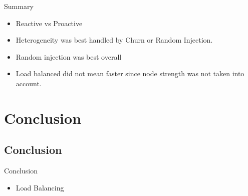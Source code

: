 \documentclass[11pt]{beamer}
\begin{document}
\begin{frame}{Summary}
	\begin{itemize}
		
		\item Reactive vs Proactive
		\item Heterogeneity was best handled by Churn or Random Injection.
		\item Random injection was best overall
		\item Load balanced did not mean faster since node strength was not taken into account.
	\end{itemize}
\end{frame}

\section{Conclusion}

\subsection{Conclusion}

\begin{frame}{Conclusion}
	\begin{itemize}
		\item Load Balancing
	\end{itemize}
\end{frame}
\end{document}
